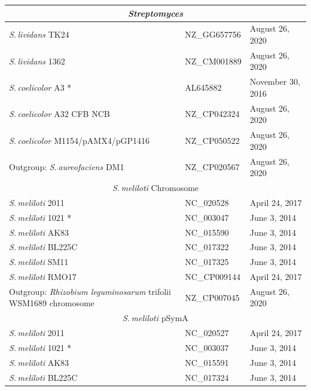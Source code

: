 \documentclass[11pt]{article}
\newcommand{\smel}{\textit{S.\,meliloti}\xspace}
\newcommand{\agrot}{\textit{Agrobacterium tumefaciens}\xspace}
\newcommand{\strep}{\textit{Streptomyces}\xspace}
\newcommand{\sliv}{\textit{S.\,lividans}\xspace}
\newcommand{\scoe}{\textit{S.\,coelicolor}\xspace}
\newcommand{\saur}{\textit{S.\,aureofaciens}\xspace} %
\newcommand{\rleg}{\textit{Rhizobium leguminosarum}\xspace} %
\newcommand{\tub}{\textit{Mycobacterium tuberculosis}\xspace}
\begin{document}
\begin{table}[H]
{\begin{minipage}{\textwidth}
\begin{tabular}{lll}
				\midrule
				\multicolumn{3}{c}{\strep} \\
				\midrule
				\sliv TK24 & NZ\_GG657756 & August 26, 2020\\
				\sliv 1362 & NZ\_CM001889 & August 26, 2020\\
				\scoe A3 * & AL645882 & November 30, 2016\\
				\scoe A32 CFB NCB & NZ\_CP042324 & August 26, 2020\\
				\scoe M1154/pAMX4/pGP1416 & NZ\_CP050522 & August 26, 2020\\
				Outgroup: \saur DM1 & NZ\_CP020567 & August 26, 2020\\	\midrule
				\multicolumn{3}{c}{\smel Chromosome}\\
				\midrule
				\smel 2011 & NC\_020528 & April 24, 2017\\
				\smel 1021 * & NC\_003047 & June 3, 2014\\
				\smel AK83 & NC\_015590 & June 3, 2014\\
				\smel BL225C & NC\_017322 & June 3, 2014\\
				\smel SM11 & NC\_017325 & June 3, 2014\\
				\smel RMO17 & NC\_CP009144 & April 24, 2017\\
				Outgroup: \rleg trifolii WSM1689 chromosome & NZ\_CP007045 & August 26, 2020\\
				\midrule
				\multicolumn{3}{c}{\smel pSymA} \\
				\midrule
				\smel 2011 & NC\_020527& April 24, 2017\\
				\smel 1021 * & NC\_003037 & June 3, 2014\\
				\smel AK83 & NC\_015591 & June 3, 2014\\
				\smel BL225C & NC\_017324 & June 3, 2014\\

\end{tabular}
\end{minipage}}
\end{table}
\end{document}
